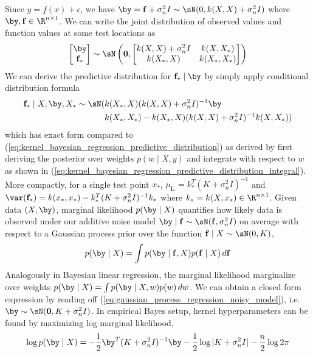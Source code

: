 \documentclass[11pt]{article}
\begin{document}
Since $y=f(x)+\epsilon$, we have $\by = \mathbf{f} + \sigma_n^2 I \sim \sN(0, k(X,X)+\sigma_n^2I)$ where $\by,\mathbf{f}\in\R^{n\times 1}$. We can write the joint distribution of observed values and function values at some test locations as
\begin{align}
    \begin{bmatrix}
        \by \\ \mathbf{f}_*
    \end{bmatrix}
    \sim
    \sN\left(
        \mathbf{0},
        \begin{bmatrix}
            k(X,X) + \sigma_n^2I & k(X,X_*) \\
            k(X_*,X) & k(X_*,X_*) \\ 
        \end{bmatrix}
    \right)
    \label{eq:gaussian_process_regression_noisy_model}
\end{align}
We can derive the predictive distribution for $\mathbf{f}_*\mid \by$ by simply apply conditional distribution formula
\begin{align}
    \mathbf{f}_* \mid X,\by, X_* \sim \sN(
        & k(X_*,X) (k(X,X)+\sigma_n^2 I)^{-1} \by  \\
        & k(X_*,X_*) - k(X_*,X) (k(X,X)+\sigma_n^2 I)^{-1} k(X,X_*) )
    \label{eq:gp_regression_predictive_distribution}
\end{align}
which has exact form compared to (\ref{eq:kernel_bayesian_regression_predictive_distribution}) as derived by first deriving the posterior over weights $p(w\mid X,y)$ and integrate with respect to $w$ as shown in (\ref{eq:kernel_bayesian_regression_predictive_distribution_integral}). More compactly, for a single test point $x_*$, $\mu_{\mathbf{f}_*} =  k_*^T (K+\sigma_n^2 I)^{-1}$ and $\var(\mathbf{f}_*) = k(x_*,x_*) - k_*^T (K+\sigma_n^2 I)^{-1} k_* $ where $k_* = k(X,x_*)\in \R^{n\times 1}$. Given data $(X,\by)$, marginal likelihood $p(\by\mid X)$ quantifies how likely data is observed under our additive noise model $\by\mid \mathbf{f} \sim \sN(\mathbf{f},\sigma_n^2 I)$ on average with respect to a Gaussian process prior over the function $\mathbf{f}\mid X \sim \sN(0,K)$,
\begin{align}
    p(\by\mid X)
        = \int p(\by\mid \mathbf{f},X) p(\mathbf{f}\mid X) \, d\mathbf{f}
\end{align}
Analogously in Bayesian linear regression, the marginal likelihood marginalize over weights $p(\by\mid X) = \int p(\by\mid X,w)p(w) \, dw$. We can obtain a closed form expression by reading off (\ref{eq:gaussian_process_regression_noisy_model}), i.e. $\by \sim \sN(\mathbf{0}, K+\sigma_n^2 I)$. In empirical Bayes setup, kernel hyperparameters can be found by maximizing log marginal likelihood,
\begin{align}
    \log p(\by\mid X)
        = -\frac{1}{2} \by^T  (K+\sigma_n^2 I)^{-1}\by - \frac{1}{2} \log |K+\sigma_n^2I| - \frac{n}{2} \log 2\pi 
\end{align}


\newpage
\printbibliography 
\end{document}
